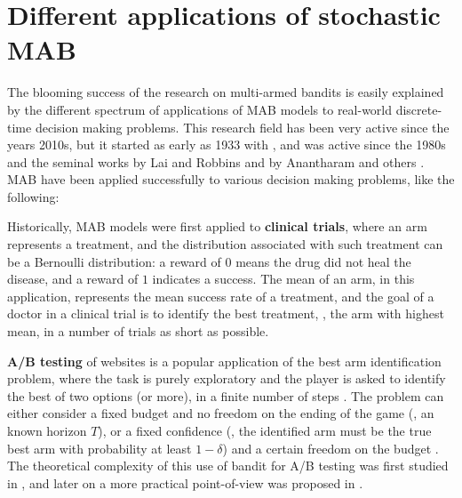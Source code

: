 \section{Different applications of stochastic MAB}
\label{sec:2:applicationsofStochasticMAB}

The blooming success of the research on multi-armed bandits is easily explained by the different spectrum of applications of MAB models to real-world discrete-time decision making problems.
This research field has been very active since the years 2010s, but it started as early as 1933 with \cite{Thompson33}, and was active since the 1980s and the seminal works by Lai and Robbins \cite{LaiRobbins85} and by Anantharam and others \cite{Anantharam87a}.
%
MAB have been applied successfully to various decision making problems, like the following:

Historically, MAB models were first applied to \textbf{clinical trials}, where an arm represents a treatment, and the distribution associated with such treatment can be a Bernoulli distribution: a reward of $0$ means the drug did not heal the disease, and a reward of $1$ indicates a success. The mean of an arm, in this application, represents the mean success rate of a treatment, and the goal of a doctor in a clinical trial is to identify the best treatment, \ie, the arm with highest mean, in a number of trials as short as possible.
%

%
    \textbf{A/B testing} of websites is a popular application of the best arm identification problem,
    where the task is purely exploratory and the player is asked to identify the best of two options (or more), in a finite number of steps \cite{audibert2010best}.
    The problem can either consider a fixed budget and no freedom on the ending of the game (\ie, an known horizon $T$), or a fixed confidence (\ie, the identified arm must be the true best arm with probability at least $1-\delta$) and a certain freedom on the budget \cite{Garivier16BAI}.
    The theoretical complexity of this use of bandit for A/B testing was first studied in \cite{Kaufmann14},
    and later on a more practical point-of-view was proposed in \cite{Jamieson17ABTest}.

